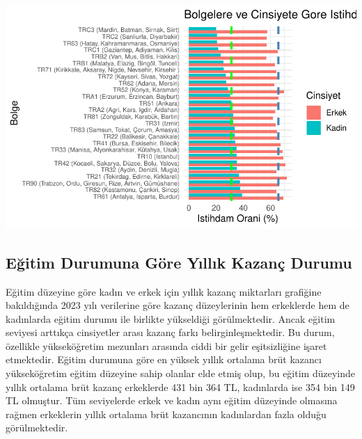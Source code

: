 \documentclass[
  11pt,
  a4paper,
  DIV=11,
  numbers=noendperiod]{scrartcl}
\begin{document}
\includegraphics{project_files/figure-pdf/unnamed-chunk-3-1.pdf}

\subsection{Eğitim Durumuna Göre Yıllık Kazanç
Durumu}\label{eux11fitim-durumuna-guxf6re-yux131llux131k-kazanuxe7-durumu}

Eğitim düzeyine göre kadın ve erkek için yıllık kazanç miktarları
grafiğine bakıldığında 2023 yılı verilerine göre kazanç düzeylerinin hem
erkeklerde hem de kadınlarda eğitim durumu ile birlikte yükseldiği
görülmektedir. Ancak eğitim seviyesi arttıkça cinsiyetler arası kazanç
farkı belirginleşmektedir. Bu durum, özellikle yükseköğretim mezunları
arasında ciddi bir gelir eşitsizliğine işaret etmektedir. Eğitim
durumuna göre en yüksek yıllık ortalama brüt kazancı yükseköğretim
eğitim düzeyine sahip olanlar elde etmiş olup, bu eğitim düzeyinde
yıllık ortalama brüt kazanç erkeklerde 431 bin 364 TL, kadınlarda ise
354 bin 149 TL olmuştur. Tüm seviyelerde erkek ve kadın aynı eğitim
düzeyinde olmasına rağmen erkeklerin yıllık ortalama brüt kazancının
kadınlardan fazla olduğu görülmektedir.
\end{document}
